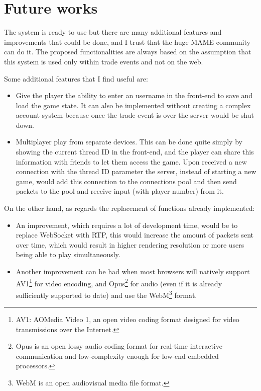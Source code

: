 \chapter{Future works}

The system is ready to use but there are many additional features and improvements that could be done, and I trust that the huge MAME community can do it. The proposed functionalities are always based on the assumption that this system is used only within trade events and not on the web.

Some additional features that I find useful are:
\begin{itemize}
	\item Give the player the ability to enter an username in the front-end to save and load the game state. It can also be implemented without creating a complex account system because once the trade event is over the server would be shut down.
	\item Multiplayer play from separate devices. This can be done quite simply by showing the current thread ID in the front-end, and the player can share this information with friends to let them access the game. Upon received a new connection with the thread ID parameter the server, instead of starting a new game, would add this connection to the connections pool and then send packets to the pool and receive input (with player number) from it.
\end{itemize}

On the other hand, as regards the replacement of functions already implemented:
\begin{itemize}
	\item An improvement, which requires a lot of development time, would be to replace WebSocket with RTP, this would increase the amount of packets sent over time, which would result in higher rendering resolution or more users being able to play simultaneously.
	\item Another improvement can be had when most browsers will natively support AV1\footnote{AV1: AOMedia Video 1, an open video coding format designed for video transmissions over the Internet.} for video encoding, and Opus\footnote{Opus is an open lossy audio coding format for real-time interactive communication and low-complexity enough for low-end embedded processors.} for audio (even if it is already sufficiently supported to date) and use the WebM\footnote{WebM is an open audiovisual media file format.} format.
\end{itemize}